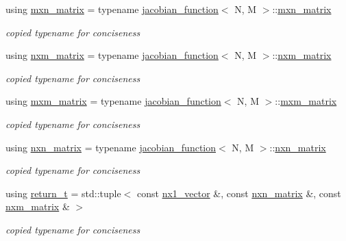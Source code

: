 \begin{DoxyCompactItemize}
\mbox{\label{classkafi_1_1kafi_aff7caef22091a9df5285ecf70dad2388}} 
using \hyperlink{classkafi_1_1kafi_aff7caef22091a9df5285ecf70dad2388}{mxn\+\_\+matrix} = typename \hyperlink{classkafi_1_1jacobian__function}{jacobian\+\_\+function}$<$ N, M $>$\+::\hyperlink{classkafi_1_1kafi_aff7caef22091a9df5285ecf70dad2388}{mxn\+\_\+matrix}
\begin{DoxyCompactList}\small\item\em copied typename for conciseness \end{DoxyCompactList}\item 
\mbox{\label{classkafi_1_1kafi_a637e94a4aa607b8c62ca61fb3d986430}} 
using \hyperlink{classkafi_1_1kafi_a637e94a4aa607b8c62ca61fb3d986430}{nxm\+\_\+matrix} = typename \hyperlink{classkafi_1_1jacobian__function}{jacobian\+\_\+function}$<$ N, M $>$\+::\hyperlink{classkafi_1_1kafi_a637e94a4aa607b8c62ca61fb3d986430}{nxm\+\_\+matrix}
\begin{DoxyCompactList}\small\item\em copied typename for conciseness \end{DoxyCompactList}\item 
\mbox{\label{classkafi_1_1kafi_af3ca34ea0c57e9054e4c2d51fc7e5971}} 
using \hyperlink{classkafi_1_1kafi_af3ca34ea0c57e9054e4c2d51fc7e5971}{mxm\+\_\+matrix} = typename \hyperlink{classkafi_1_1jacobian__function}{jacobian\+\_\+function}$<$ N, M $>$\+::\hyperlink{classkafi_1_1kafi_af3ca34ea0c57e9054e4c2d51fc7e5971}{mxm\+\_\+matrix}
\begin{DoxyCompactList}\small\item\em copied typename for conciseness \end{DoxyCompactList}\item 
\mbox{\label{classkafi_1_1kafi_a771d8045a61e16033e4a644675b5f4e7}} 
using \hyperlink{classkafi_1_1kafi_a771d8045a61e16033e4a644675b5f4e7}{nxn\+\_\+matrix} = typename \hyperlink{classkafi_1_1jacobian__function}{jacobian\+\_\+function}$<$ N, M $>$\+::\hyperlink{classkafi_1_1kafi_a771d8045a61e16033e4a644675b5f4e7}{nxn\+\_\+matrix}
\begin{DoxyCompactList}\small\item\em copied typename for conciseness \end{DoxyCompactList}\item 
using \hyperlink{classkafi_1_1kafi_a7dcd4a6f44ce454d56328f38ab053927}{return\+\_\+t} = std\+::tuple$<$ const \hyperlink{classkafi_1_1kafi_a47144ae2efe936ede222eced035a6e46}{nx1\+\_\+vector} \&, const \hyperlink{classkafi_1_1kafi_a771d8045a61e16033e4a644675b5f4e7}{nxn\+\_\+matrix} \&, const \hyperlink{classkafi_1_1kafi_a637e94a4aa607b8c62ca61fb3d986430}{nxm\+\_\+matrix} \& $>$
\begin{DoxyCompactList}\small\item\em copied typename for conciseness \end{DoxyCompactList}\end{DoxyCompactItemize}
